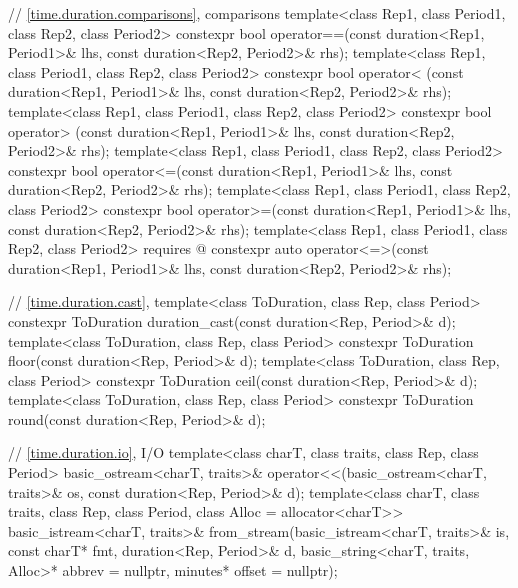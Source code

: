 \begin{codeblock}
{{    // \ref{time.duration.comparisons},  comparisons
    template<class Rep1, class Period1, class Rep2, class Period2>
      constexpr bool operator==(const duration<Rep1, Period1>& lhs,
                                const duration<Rep2, Period2>& rhs);
    template<class Rep1, class Period1, class Rep2, class Period2>
      constexpr bool operator< (const duration<Rep1, Period1>& lhs,
                                const duration<Rep2, Period2>& rhs);
    template<class Rep1, class Period1, class Rep2, class Period2>
      constexpr bool operator> (const duration<Rep1, Period1>& lhs,
                                const duration<Rep2, Period2>& rhs);
    template<class Rep1, class Period1, class Rep2, class Period2>
      constexpr bool operator<=(const duration<Rep1, Period1>& lhs,
                                const duration<Rep2, Period2>& rhs);
    template<class Rep1, class Period1, class Rep2, class Period2>
      constexpr bool operator>=(const duration<Rep1, Period1>& lhs,
                                const duration<Rep2, Period2>& rhs);
    template<class Rep1, class Period1, class Rep2, class Period2>
      requires @\seebelow@
      constexpr auto operator<=>(const duration<Rep1, Period1>& lhs,
                                 const duration<Rep2, Period2>& rhs);

    // \ref{time.duration.cast}, 
    template<class ToDuration, class Rep, class Period>
      constexpr ToDuration duration_cast(const duration<Rep, Period>& d);
    template<class ToDuration, class Rep, class Period>
      constexpr ToDuration floor(const duration<Rep, Period>& d);
    template<class ToDuration, class Rep, class Period>
      constexpr ToDuration ceil(const duration<Rep, Period>& d);
    template<class ToDuration, class Rep, class Period>
      constexpr ToDuration round(const duration<Rep, Period>& d);

    // \ref{time.duration.io},  I/O
    template<class charT, class traits, class Rep, class Period>
      basic_ostream<charT, traits>&
        operator<<(basic_ostream<charT, traits>& os,
                   const duration<Rep, Period>& d);
    template<class charT, class traits, class Rep, class Period, class Alloc = allocator<charT>>
      basic_istream<charT, traits>&
        from_stream(basic_istream<charT, traits>& is, const charT* fmt,
                    duration<Rep, Period>& d,
                    basic_string<charT, traits, Alloc>* abbrev = nullptr,
                    minutes* offset = nullptr);

}}
\end{codeblock}
